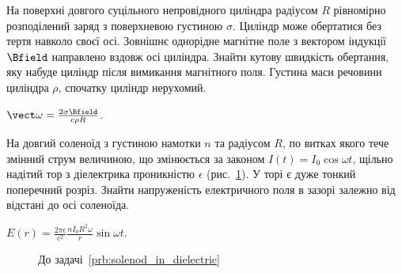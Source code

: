 \begin{problem}
На поверхні довгого суцільного непровідного циліндра радіусом $R$ рівномірно розподілений заряд з поверхневою густиною $\sigma$. Циліндр може обертатися без тертя навколо своєї осі. Зовнішнє однорідне магнітне поле з вектором індукції $\Bfield$ направлено вздовж осі циліндра. Знайти кутову швидкість обертання, яку набуде циліндр після вимикання магнітного поля. Густина маси речовини циліндра $\rho$, спочатку циліндр нерухомий.
\begin{solution}
	$\vect\omega = \frac{2\sigma\Bfield}{c\rho R}$.
\end{solution}
\end{problem}


\begin{problem}\label{prb:solenod_in_dielectric}
На довгий соленоїд з густиною намотки $n$ та радіусом $R$, по витках якого тече змінний струм величиною, що змінюється за законом $I(t) = I_0 \cos\omega t$, щільно надітий тор з діелектрика проникністю $\epsilon$ (рис.~\ref{solenod_in_dielectric}). У торі є дуже тонкий поперечний розріз. Знайти напруженість електричного поля в зазорі залежно від відстані до осі соленоїда.
\begin{solution}
	$E(r) = \frac{2\pi\epsilon}{c^2}\frac{nI_0R^2\omega}{r}\sin\omega t$.
\end{solution}
\end{problem}
\begin{figure}[h!]\centering
	\caption{До задачі~\ref{prb:solenod_in_dielectric}}
	\label{solenod_in_dielectric}
\end{figure}



